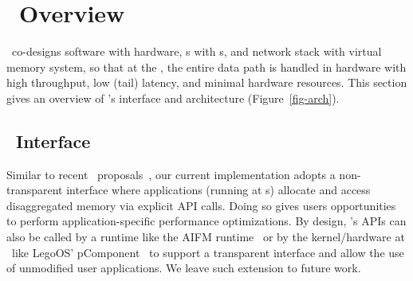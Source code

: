 


\section{\sys\ Overview}
\label{sec:hdm}

\sys\ co-designs software with hardware, \CN{}s with \MN{}s, and network stack with virtual memory system, 
so that at the \MN{}, the entire data path is handled in hardware with high throughput, low (tail) latency, and minimal hardware resources. 
This section gives an overview of \sys's interface and architecture (Figure~\ref{fig-arch}).




\subsection{\sys\ Interface}
\label{sec:abstraction}


Similar to recent \md\ proposals~\cite{AIFM,sebastian-hotcloud20}, our current implementation adopts a non-transparent interface where
applications (running at \CN{}s) allocate and access disaggregated memory via explicit API calls. Doing so gives users opportunities to perform application-specific performance optimizations. 
By design, \sys’s APIs can also be called by a runtime like the AIFM runtime~\cite{AIFM} or by the kernel/hardware at \CN\ like LegoOS' pComponent~\cite{Shan18-OSDI} to support a transparent interface and allow the use of unmodified user applications.
We leave such extension to future work.

